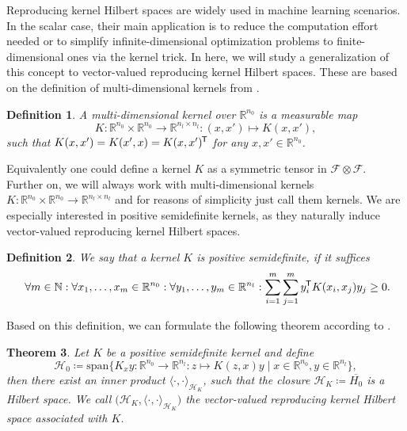\documentclass[11pt, a4paper]{article}
\newtheorem{theorem}{Theorem}[section]
\newtheorem{definition}[theorem]{Definition}
\newcommand{\N}{\mathbb{N}}
\newcommand{\R}{\mathbb{R}}
\newcommand{\F}{\mathcal{F}}
\renewcommand{\H}{\mathcal{H}}
\newcommand*{\tr}{^{\mkern-1.5mu\mathsf{T}}}
\begin{document}
Reproducing kernel Hilbert spaces are widely used in machine learning scenarios. In the scalar case, their main application is to reduce the computation effort needed or to simplify infinite-dimensional optimization problems to finite-dimensional ones via the kernel trick. In here, we will study a generalization of this concept to vector-valued reproducing kernel Hilbert spaces. These are based on the definition of multi-dimensional kernels from \cite{NTK}.

\begin{definition}
A multi-dimensional kernel over $\R^{n_0}$ is a measurable map
\[ K: \R^{n_0} \times \R^{n_0} \to \R^{n_l \times n_l} : (x,x') \mapsto K(x,x'), \]
such that $K(x,x') = K(x',x) = K(x,x')\tr$ for any $x,x' \in \R^{n_0}$.
\end{definition}

Equivalently one could define a kernel $K$ as a symmetric tensor in $\F \otimes \F$. Further on, we will always work with multi-dimensional kernels $K: \R^{n_0} \times \R^{n_0} \to \R^{n_l \times n_l}$ and for reasons of simplicity just call them kernels. We are especially interested in positive semidefinite kernels, as they naturally induce vector-valued reproducing kernel Hilbert spaces.

\begin{definition}
We say that a kernel $K$ is positive semidefinite, if it suffices
\[ \forall m \in \N : \forall x_1, \dots, x_m \in \R^{n_0} : \forall y_1, \dots, y_m \in \R^{n_l}: \sum_{i=1}^{m} \sum_{j=1}^{m} y_i \tr K(x_i, x_j) y_j \geq 0. \]
\end{definition}

Based on this definition, we can formulate the following theorem according to \cite{RKHS}.

\begin{theorem} \label{thm:rkhs}
Let $K$ be a positive semidefinite kernel and define
\[ \H_0 \coloneq \text{span} \Big \{ K_xy : \R^{n_0} \to \R^{n_l} : z \mapsto K(z,x)y \mid x \in \R^{n_0}, y \in \R^{n_l} \Big \}, \]
then there exist an inner product $\langle \cdot, \cdot \rangle_{\H_K}$, such that the closure $\H_K \coloneq \overline{H_0}$ is a Hilbert space.
We call $\big (\H_K, \langle \cdot, \cdot \rangle_{\H_K} \big )$ the vector-valued reproducing kernel Hilbert space associated with $K$.
\end{theorem}
\end{document}
